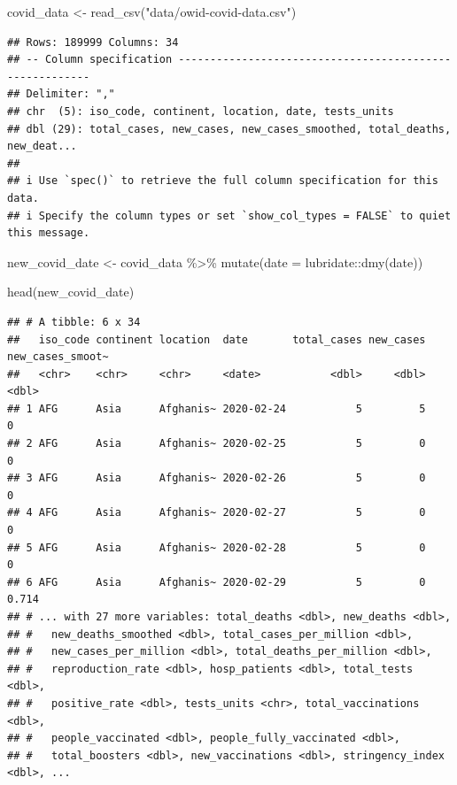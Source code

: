 \documentclass[
]{article}
\newenvironment{Shaded}{\begin{snugshade}}{\end{snugshade}}
\newcommand{\AttributeTok}[1]{\textcolor[rgb]{0.77,0.63,0.00}{#1}}
\newcommand{\FunctionTok}[1]{\textcolor[rgb]{0.00,0.00,0.00}{#1}}
\newcommand{\NormalTok}[1]{#1}
\newcommand{\OtherTok}[1]{\textcolor[rgb]{0.56,0.35,0.01}{#1}}
\newcommand{\SpecialCharTok}[1]{\textcolor[rgb]{0.00,0.00,0.00}{#1}}
\newcommand{\StringTok}[1]{\textcolor[rgb]{0.31,0.60,0.02}{#1}}
\begin{document}
\begin{Shaded}
\begin{Highlighting}[]
\NormalTok{covid\_data }\OtherTok{\textless{}{-}} \FunctionTok{read\_csv}\NormalTok{(}\StringTok{"data/owid{-}covid{-}data.csv"}\NormalTok{)}
\end{Highlighting}
\end{Shaded}

\begin{verbatim}
## Rows: 189999 Columns: 34
## -- Column specification --------------------------------------------------------
## Delimiter: ","
## chr  (5): iso_code, continent, location, date, tests_units
## dbl (29): total_cases, new_cases, new_cases_smoothed, total_deaths, new_deat...
## 
## i Use `spec()` to retrieve the full column specification for this data.
## i Specify the column types or set `show_col_types = FALSE` to quiet this message.
\end{verbatim}

\begin{Shaded}
\begin{Highlighting}[]
\NormalTok{new\_covid\_date }\OtherTok{\textless{}{-}}\NormalTok{ covid\_data }\SpecialCharTok{\%\textgreater{}\%} 
  \FunctionTok{mutate}\NormalTok{(}\AttributeTok{date =}\NormalTok{ lubridate}\SpecialCharTok{::}\FunctionTok{dmy}\NormalTok{(date))}

\FunctionTok{head}\NormalTok{(new\_covid\_date)}
\end{Highlighting}
\end{Shaded}

\begin{verbatim}
## # A tibble: 6 x 34
##   iso_code continent location  date       total_cases new_cases new_cases_smoot~
##   <chr>    <chr>     <chr>     <date>           <dbl>     <dbl>            <dbl>
## 1 AFG      Asia      Afghanis~ 2020-02-24           5         5            0    
## 2 AFG      Asia      Afghanis~ 2020-02-25           5         0            0    
## 3 AFG      Asia      Afghanis~ 2020-02-26           5         0            0    
## 4 AFG      Asia      Afghanis~ 2020-02-27           5         0            0    
## 5 AFG      Asia      Afghanis~ 2020-02-28           5         0            0    
## 6 AFG      Asia      Afghanis~ 2020-02-29           5         0            0.714
## # ... with 27 more variables: total_deaths <dbl>, new_deaths <dbl>,
## #   new_deaths_smoothed <dbl>, total_cases_per_million <dbl>,
## #   new_cases_per_million <dbl>, total_deaths_per_million <dbl>,
## #   reproduction_rate <dbl>, hosp_patients <dbl>, total_tests <dbl>,
## #   positive_rate <dbl>, tests_units <chr>, total_vaccinations <dbl>,
## #   people_vaccinated <dbl>, people_fully_vaccinated <dbl>,
## #   total_boosters <dbl>, new_vaccinations <dbl>, stringency_index <dbl>, ...
\end{verbatim}
\end{document}
